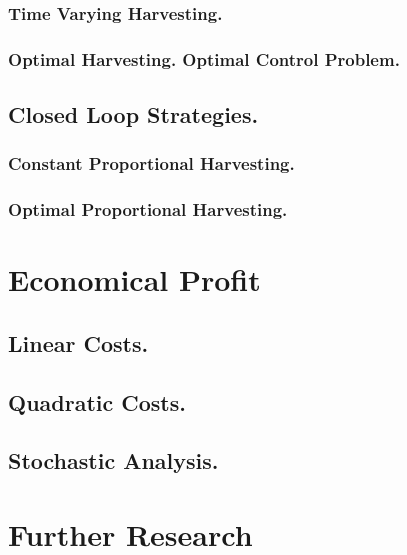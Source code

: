 \documentclass[twoside,colorback,accentcolor=tud4c,11pt]{tudreport}
\begin{document}
		\subsection{Time Varying Harvesting.}
		
		\subsection{Optimal Harvesting. Optimal Control Problem.}
		
	\section{Closed Loop Strategies.}
		
		\subsection{Constant Proportional Harvesting.}
		
		\subsection{Optimal Proportional Harvesting.}
		
\chapter{Economical Profit}\label{chap: Economical Profit}
	
	\section{Linear Costs.}
	
	\section{Quadratic Costs.}
	
	\section{Stochastic Analysis.}
	
\chapter{Further Research}\label{chap: Further Enhancements}
\end{document}
